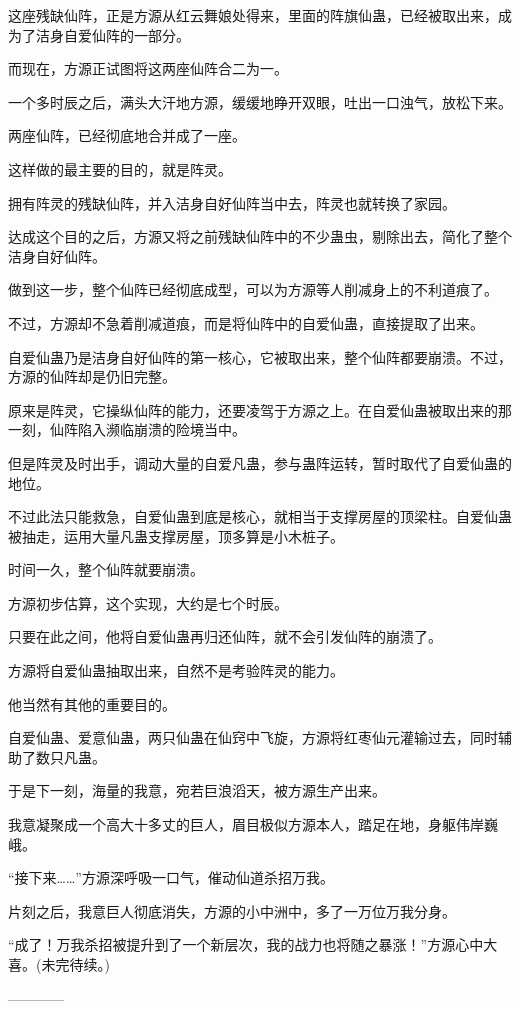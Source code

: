 \begin{this_body}
这座残缺仙阵，正是方源从红云舞娘处得来，里面的阵旗仙蛊，已经被取出来，成为了洁身自爱仙阵的一部分。

而现在，方源正试图将这两座仙阵合二为一。

一个多时辰之后，满头大汗地方源，缓缓地睁开双眼，吐出一口浊气，放松下来。

两座仙阵，已经彻底地合并成了一座。

这样做的最主要的目的，就是阵灵。

拥有阵灵的残缺仙阵，并入洁身自好仙阵当中去，阵灵也就转换了家园。

达成这个目的之后，方源又将之前残缺仙阵中的不少蛊虫，剔除出去，简化了整个洁身自好仙阵。

做到这一步，整个仙阵已经彻底成型，可以为方源等人削减身上的不利道痕了。

不过，方源却不急着削减道痕，而是将仙阵中的自爱仙蛊，直接提取了出来。

自爱仙蛊乃是洁身自好仙阵的第一核心，它被取出来，整个仙阵都要崩溃。不过，方源的仙阵却是仍旧完整。

原来是阵灵，它操纵仙阵的能力，还要凌驾于方源之上。在自爱仙蛊被取出来的那一刻，仙阵陷入濒临崩溃的险境当中。

但是阵灵及时出手，调动大量的自爱凡蛊，参与蛊阵运转，暂时取代了自爱仙蛊的地位。

不过此法只能救急，自爱仙蛊到底是核心，就相当于支撑房屋的顶梁柱。自爱仙蛊被抽走，运用大量凡蛊支撑房屋，顶多算是小木桩子。

时间一久，整个仙阵就要崩溃。

方源初步估算，这个实现，大约是七个时辰。

只要在此之间，他将自爱仙蛊再归还仙阵，就不会引发仙阵的崩溃了。

方源将自爱仙蛊抽取出来，自然不是考验阵灵的能力。

他当然有其他的重要目的。

自爱仙蛊、爱意仙蛊，两只仙蛊在仙窍中飞旋，方源将红枣仙元灌输过去，同时辅助了数只凡蛊。

于是下一刻，海量的我意，宛若巨浪滔天，被方源生产出来。

我意凝聚成一个高大十多丈的巨人，眉目极似方源本人，踏足在地，身躯伟岸巍峨。

“接下来……”方源深呼吸一口气，催动仙道杀招万我。

片刻之后，我意巨人彻底消失，方源的小中洲中，多了一万位万我分身。

“成了！万我杀招被提升到了一个新层次，我的战力也将随之暴涨！”方源心中大喜。(未完待续。)

------------

\end{this_body}

